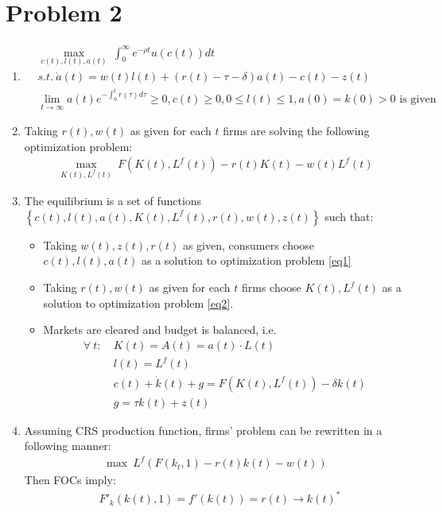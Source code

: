 \documentclass[a4paper]{article}
\begin{document}
\section*{Problem 2}
\begin{enumerate}
	\item \begin{align}\label{eq1}
	&\underset{c(t), l(t), a(t)}{\max}\ \int_{0}^{\infty} e^{-\rho t} u(c(t))dt\\
	&s.t.\ \dot{a}(t) = w(t)l(t) + (r(t) - \tau - \delta)a(t) - c(t) - z(t)\nonumber\\
	&\lim_{t \to \infty} a(t)e^{-\int_{0}^t r(\tau)d\tau} \ge 0, c(t) \ge 0, 0 \le l(t) \le 1, a(0) = k(0) > 0 \text{ is given }\nonumber
	\end{align}
	\item Taking $r(t), w(t)$ as given for each $t$ firms are solving the following optimization problem:
	\begin{align}\label{eq2}
	\underset{K(t), L^f(t)}{\max}\ F(K(t), L^f(t)) - r(t)K(t) - w(t)L^f(t)
	\end{align}
	\item The equilibrium is a set of functions $\left\{c(t), l(t), a(t), K(t), L^f(t), r(t), w(t), z(t)\right\}$ such that:
	\begin{itemize}
		\item Taking $w(t), z(t), r(t)$ as given, consumers choose $c(t), l(t), a(t)$ as a solution to optimization problem \eqref{eq1}
		\item Taking $r(t), w(t)$ as given for each $t$ firms choose $K(t), L^f(t)$ as a solution to optimization problem \eqref{eq2}.
		\item Markets are cleared and budget is balanced, i.e.
		\begin{align*}
		\forall\ t:\ &K(t) = A(t) = a(t) \cdot L(t)\\
		&l(t) = L^f(t)\\
		&c(t) + \dot{k}(t) + g = F(K(t), L^f(t)) - \delta k(t)\\
		&g = \tau k(t) + z(t)
		\end{align*}
	\end{itemize}
\item Assuming CRS production function, firms' problem can be rewritten in a following manner:
\begin{align*}
\max\ L^f(F(k_t, 1) - r(t)k(t) - w(t))
\end{align*}
Then FOCs imply:
\begin{align*}
&F'_k(k(t), 1) = f'(k(t)) = r(t) \to k(t)^*\\

\end{align*}
\end{enumerate}
\end{document}
